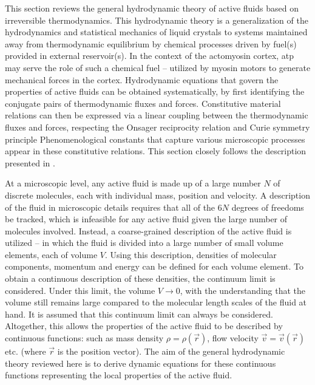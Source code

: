 This section reviews the general hydrodynamic theory of active fluids based on irreversible thermodynamics. This hydrodynamic theory is a generalization of the hydrodynamics and statistical mechanics of liquid crystals \citep{de1993physics} to systems maintained away from thermodynamic equilibrium by chemical processes driven by fuel(s) provided in external reservoir(s). In the context of the actomyosin cortex, \ac{atp} may serve the role of such a chemical fuel -- utilized by myosin motors to generate mechanical forces in the cortex. Hydrodynamic equations that govern the properties of active fluids can be obtained systematically, by first identifying the conjugate pairs of thermodynamic fluxes and forces. Constitutive material relations can then be expressed via a linear coupling between the thermodynamic fluxes and forces, respecting the Onsager reciprocity relation \citep{onsager1931reciprocalI,onsager1931reciprocalII,mazur1953onsager,casimir1945onsager} and Curie symmetry principle \citep{curie1894symmetry} Phenomenological constants that capture various microscopic processes appear in these constitutive relations. This section closely follows the description presented in \cite{julicher2018hydrodynamic,de2013non,sebastian2012activeChiral}.

At a microscopic level, any active fluid is made up of a large number $N$ of discrete molecules, each with individual mass, position and velocity. A description of the fluid in microscopic details requires that all of the $6N$ degrees of freedoms be tracked, which is infeasible for any active fluid given the large number of molecules involved. Instead, a coarse-grained description of the active fluid is utilized -- in which the fluid is divided into a large number of small volume elements, each of volume $V$. Using this description, densities of molecular components, momentum and energy can be defined for each volume element. To obtain a continuous description of these densities, the continuum limit is considered. Under this limit, the volume $V \rightarrow 0$, with the understanding that the volume still remains large compared to the molecular length scales of the fluid at hand. It is assumed that this continuum limit can always be considered. Altogether, this allows the properties of the active fluid to be described by continuous functions: such as mass density $\rho = \rho(\vec{r})$, flow velocity $\vec{v} = \vec{v}(\vec{r})$ etc. (where $\vec{r}$ is the position vector). The aim of the general hydrodynamic theory reviewed here is to derive dynamic equations for these continuous functions representing the local properties of the active fluid.

